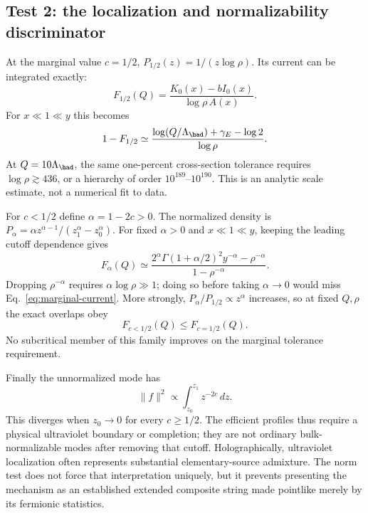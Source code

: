 \subsection{Test 2: the localization and normalizability discriminator}
At the marginal value $c=1/2$, $P_{1/2}(z)=1/(z\log\rho)$. Its current can be integrated exactly:
\begin{equation}
 F_{1/2}(Q)=\frac{K_0(x)-bI_0(x)}{\log\rho\, A(x)}.
\end{equation}
For $x\ll1\ll y$ this becomes
\begin{equation}
 1-F_{1/2}\simeq
 \frac{\log(Q/\Lambda_{\had})+\gamma_E-\log2}{\log\rho}.
 \label{eq:marginal-current}
\end{equation}
At $Q=10\Lambda_{\had}$, the same one-percent cross-section tolerance requires $\log\rho\gtrsim436$, or a hierarchy of order $10^{189}$--$10^{190}$. This is an analytic scale estimate, not a numerical fit to data.

For $c<1/2$ define $\alpha=1-2c>0$. The normalized density is
$P_\alpha=\alpha z^{\alpha-1}/(z_1^\alpha-z_0^\alpha)$. For fixed $\alpha>0$ and $x\ll1\ll y$, keeping the leading cutoff dependence gives
\begin{equation}
 F_\alpha(Q)\simeq
 \frac{2^\alpha\Gamma(1+\alpha/2)^2 y^{-\alpha}-\rho^{-\alpha}}
 {1-\rho^{-\alpha}}.
\end{equation}
Dropping $\rho^{-\alpha}$ requires $\alpha\log\rho\gg1$; doing so before taking $\alpha\to0$ would miss Eq.~\eqref{eq:marginal-current}. More strongly, $P_\alpha/P_{1/2}\propto z^\alpha$ increases, so at fixed $Q,\rho$ the exact overlaps obey
\begin{equation}
 F_{c<1/2}(Q)\leq F_{c=1/2}(Q).
\end{equation}
No subcritical member of this family improves on the marginal tolerance requirement.

Finally the unnormalized mode has
\begin{equation}
 \|f\|^2\propto\int_{z_0}^{z_1}z^{-2c}\,dz.
\end{equation}
This diverges when $z_0\to0$ for every $c\geq1/2$. The efficient profiles thus require a physical ultraviolet boundary or completion; they are not ordinary bulk-normalizable modes after removing that cutoff. Holographically, ultraviolet localization often represents substantial elementary-source admixture. The norm test does not force that interpretation uniquely, but it prevents presenting the mechanism as an established extended composite string made pointlike merely by its fermionic statistics.

